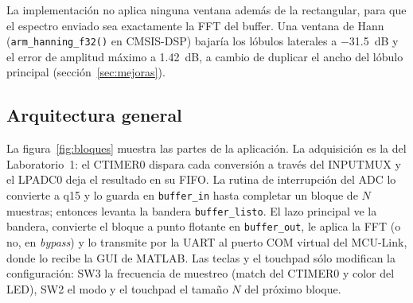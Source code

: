 \documentclass[11pt,a4paper]{article}
\begin{document}
La implementación no aplica ninguna ventana además de la rectangular, para
que el espectro enviado sea exactamente la FFT del buffer. Una ventana de
Hann (\texttt{arm\_hanning\_f32()} en CMSIS-DSP) bajaría los lóbulos
laterales a \qty{-31.5}{\deci\bel} y el error de amplitud máximo a
\qty{1.42}{\deci\bel}, a cambio de duplicar el ancho del lóbulo principal
(sección~\ref{sec:mejoras}).

\label{sec:diseno}

\subsection{Arquitectura general}

La figura~\ref{fig:bloques} muestra las partes de la aplicación. La
adquisición es la del Laboratorio~1: el CTIMER0 dispara cada conversión a
través del INPUTMUX y el LPADC0 deja el resultado en su FIFO. La rutina de
interrupción del ADC lo convierte a q15 y lo guarda en \texttt{buffer\_in}
hasta completar un bloque de $N$ muestras; entonces levanta la bandera
\texttt{buffer\_listo}. El lazo principal ve la bandera, convierte el bloque
a punto flotante en \texttt{buffer\_out}, le aplica la FFT (o no, en
\emph{bypass}) y lo transmite por la UART al puerto COM virtual del
MCU-Link, donde lo recibe la GUI de MATLAB. Las teclas y el touchpad sólo
modifican la configuración: SW3 la frecuencia de muestreo (match del
CTIMER0 y color del LED), SW2 el modo y el touchpad el tamaño $N$ del
próximo bloque.
\end{document}
